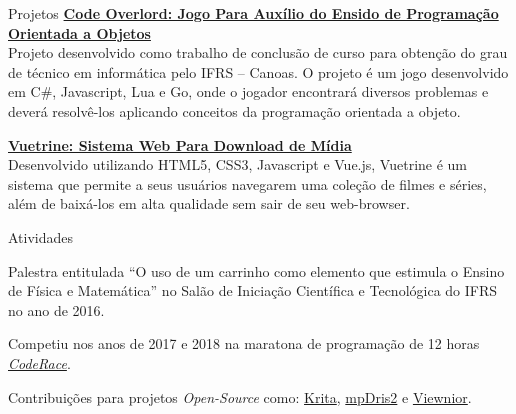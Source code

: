 \documentclass[hidelinks]{resume} %
\begin{document}
\begin{rSection}{Projetos}
\href{https://github.com/PietroCarrara/CodeOverlord}{{\bf Code Overlord: Jogo Para Auxílio do Ensido de Programação Orientada a Objetos}}\\
Projeto desenvolvido como trabalho de conclusão de curso para obtenção do grau de técnico em informática pelo IFRS --
Canoas. O projeto é um jogo desenvolvido em C\#, Javascript, Lua e Go, onde o jogador encontrará diversos problemas e deverá resolvê-los aplicando conceitos da programação orientada a objeto.

\href{https://github.com/PietroCarrara/vuetrine}{{\bf Vuetrine: Sistema Web Para Download de Mídia}}\\
Desenvolvido utilizando HTML5, CSS3, Javascript e Vue.js, Vuetrine é um sistema que permite a seus usuários navegarem uma coleção de filmes e séries, além de baixá-los em alta qualidade sem sair de seu web-browser.

\end{rSection}





\begin{rSection}{Atividades}

 Palestra entitulada ``O uso de um carrinho como elemento que estimula o Ensino de Física e Matemática'' no Salão de
 Iniciação Científica e Tecnológica do IFRS no ano de 2016.

 Competiu nos anos de 2017 e 2018 na maratona de programação de 12 horas \textit{\href{https://www.coderace.com.br/}{CodeRace}}.

 Contribuições para projetos \textit{Open-Source} como: \href{https://github.com/KDE/krita/commits?author=PietroCarrara}{Krita},
 \href{https://github.com/eonpatapon/mpDris2/commits?author=PietroCarrara}{mpDris2} e
 \href{https://github.com/hellosiyan/Viewnior/commits?author=PietroCarrara}{Viewnior}.
\end{rSection}
\end{document}
